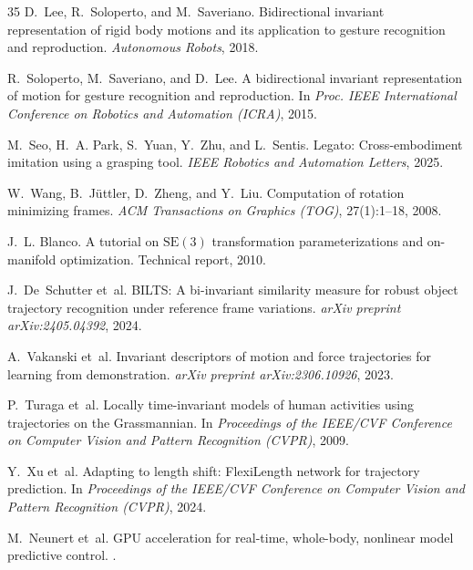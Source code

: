 \documentclass[11pt]{article}
\begin{document}
\begin{thebibliography}{35}
  D.~Lee, R.~Soloperto, and M.~Saveriano.
  \newblock Bidirectional invariant representation of rigid body motions and its application to gesture recognition and reproduction.
  \newblock \emph{Autonomous Robots}, 2018.

  R.~Soloperto, M.~Saveriano, and D.~Lee.
  \newblock A bidirectional invariant representation of motion for gesture recognition and reproduction.
  \newblock In \emph{Proc. IEEE International Conference on Robotics and Automation (ICRA)}, 2015.

  M.~Seo, H.~A. Park, S.~Yuan, Y.~Zhu, and L.~Sentis.
  \newblock Legato: Cross-embodiment imitation using a grasping tool.
  \newblock \emph{IEEE Robotics and Automation Letters}, 2025.

  W.~Wang, B.~J\"uttler, D.~Zheng, and Y.~Liu.
  \newblock Computation of rotation minimizing frames.
  \newblock \emph{ACM Transactions on Graphics (TOG)}, 27(1):1--18, 2008.

  J.~L. Blanco.
  \newblock A tutorial on $\mathrm{SE}(3)$ transformation parameterizations and on-manifold optimization.
  \newblock Technical report, 2010.

  J.~De~Schutter et~al.
  \newblock BILTS: A bi-invariant similarity measure for robust object trajectory recognition under reference frame variations.
  \newblock \emph{arXiv preprint arXiv:2405.04392}, 2024.

  A.~Vakanski et~al.
  \newblock Invariant descriptors of motion and force trajectories for learning from demonstration.
  \newblock \emph{arXiv preprint arXiv:2306.10926}, 2023.

  P.~Turaga et~al.
  \newblock Locally time-invariant models of human activities using trajectories on the Grassmannian.
  \newblock In \emph{Proceedings of the IEEE/CVF Conference on Computer Vision and Pattern Recognition (CVPR)}, 2009.

  Y.~Xu et~al.
  \newblock Adapting to length shift: FlexiLength network for trajectory prediction.
  \newblock In \emph{Proceedings of the IEEE/CVF Conference on Computer Vision and Pattern Recognition (CVPR)}, 2024.

  M.~Neunert et~al.
  \newblock GPU acceleration for real-time, whole-body, nonlinear model predictive control.
  .


\end{thebibliography}
\end{document}
